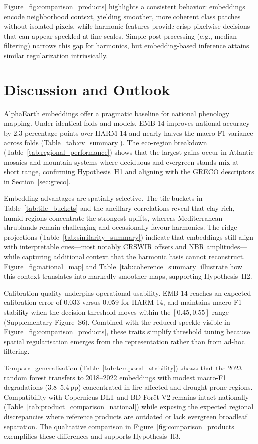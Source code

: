 \documentclass[utf8]{FrontiersinHarvard}
\begin{document}
Figure~\ref{fig:comparison_products} highlights a consistent behavior: embeddings encode neighborhood context, yielding smoother, more coherent class patches without isolated pixels, while harmonic features provide crisp pixelwise decisions that can appear speckled at fine scales. Simple post‑processing (e.g., median filtering) narrows this gap for harmonics, but embedding‑based inference attains similar regularization intrinsically.


\section{Discussion and Outlook}

AlphaEarth embeddings \citep{AlphaEarth2025} offer a pragmatic baseline for national phenology mapping. Under identical folds and models, EMB-14 improves national accuracy by 2.3 percentage points over HARM-14 and nearly halves the macro-F1 variance across folds (Table~\ref{tab:cv_summary}). The eco-region breakdown (Table~\ref{tab:regional_performance}) shows that the largest gains occur in Atlantic mosaics and mountain systems where deciduous and evergreen stands mix at short range, confirming Hypothesis~H1 and aligning with the GRECO descriptors in Section~\ref{sec:greco}.

Embedding advantages are spatially selective. The tile buckets in Table~\ref{tab:tile_buckets} and the ancillary correlations reveal that clay-rich, humid regions concentrate the strongest uplifts, whereas Mediterranean shrublands remain challenging and occasionally favour harmonics. The ridge projections (Table~\ref{tab:similarity_summary}) indicate that embeddings still align with interpretable cues—most notably CRSWIR offsets and NBR amplitudes—while capturing additional context that the harmonic basis cannot reconstruct. Figure~\ref{fig:national_map} and Table~\ref{tab:coherence_summary} illustrate how this context translates into markedly smoother maps, supporting Hypothesis~H2.

Calibration quality underpins operational usability. EMB-14 reaches an expected calibration error of 0.033 versus 0.059 for HARM-14, and maintains macro-F1 stability when the decision threshold moves within the \([0.45,0.55]\) range (Supplementary Figure~S6). Combined with the reduced speckle visible in Figure~\ref{fig:comparison_products}, these traits simplify threshold tuning because spatial regularisation emerges from the representation rather than from ad-hoc filtering.

Temporal generalisation (Table~\ref{tab:temporal_stability}) shows that the 2023 random forest transfers to 2018--2022 embeddings with modest macro-F1 degradations (3.8--5.4\,pp) concentrated in fire-affected and drought-prone regions. Compatibility with Copernicus DLT and BD Forêt V2 remains intact nationally (Table~\ref{tab:product_comparison_national}) while exposing the expected regional discrepancies where reference products are outdated or lack evergreen broadleaf separation. The qualitative comparison in Figure~\ref{fig:comparison_products} exemplifies these differences and supports Hypothesis~H3.
\end{document}
